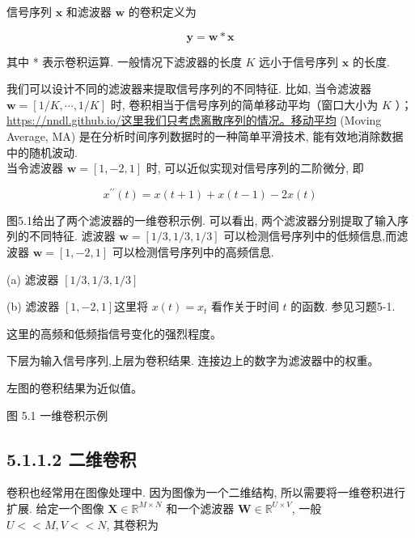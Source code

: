 \documentclass[10pt]{article}
\begin{document}
信号序列 $\boldsymbol{x}$ 和滤波器 $\boldsymbol{w}$ 的卷积定义为


\begin{equation*}
\boldsymbol{y}=\boldsymbol{w} * \boldsymbol{x} \tag{5.5}
\end{equation*}


其中 * 表示卷积运算. 一般情况下滤波器的长度 $K$ 远小于信号序列 $\boldsymbol{x}$ 的长度.

我们可以设计不同的滤波器来提取信号序列的不同特征. 比如, 当令滤波器 $\boldsymbol{w}=[1 / K, \cdots, 1 / K]$ 时, 卷积相当于信号序列的简单移动平均（窗口大小为 $K$ ）； \href{https://nndl.github.io/%E8%BF%99%E9%87%8C%E6%88%91%E4%BB%AC%E5%8F%AA%E8%80%83%E8%99%91%E7%A6%BB%E6%95%A3%E5%BA%8F%E5%88%97%E7%9A%84%E6%83%85%E5%86%B5%E3%80%82%E7%A7%BB%E5%8A%A8%E5%B9%B3%E5%9D%87}{https://nndl.github.io/这里我们只考虑离散序列的情况。移动平均} (Moving Average, MA) 是在分析时间序列数据时的一种简单平滑技术, 能有效地消除数据中的随机波动.\\
当令滤波器 $\boldsymbol{w}=[1,-2,1]$ 时, 可以近似实现对信号序列的二阶微分, 即


\begin{equation*}
x^{\prime \prime}(t)=x(t+1)+x(t-1)-2 x(t) \tag{5.6}
\end{equation*}


图5.1给出了两个滤波器的一维卷积示例. 可以看出, 两个滤波器分别提取了输入序列的不同特征. 滤波器 $\boldsymbol{w}=[1 / 3,1 / 3,1 / 3]$ 可以检测信号序列中的低频信息,而滤波器 $\boldsymbol{w}=[1,-2,1]$ 可以检测信号序列中的高频信息.



(a) 滤波器 $[1 / 3,1 / 3,1 / 3]$



(b) 滤波器 $[1,-2,1]$这里将 $x(t)=x_{t}$ 看作关于时间 $t$ 的函数. 参见习题5-1.

这里的高频和低频指信号变化的强烈程度。

下层为输入信号序列,上层为卷积结果. 连接边上的数字为滤波器中的权重。

左图的卷积结果为近似值。

图 5.1 一维卷积示例

\subsection*{5.1.1.2 二维卷积}
卷积也经常用在图像处理中. 因为图像为一个二维结构, 所以需要将一维卷积进行扩展. 给定一个图像 $\boldsymbol{X} \in \mathbb{R}^{M \times N}$ 和一个滤波器 $\boldsymbol{W} \in \mathbb{R}^{U \times V}$, 一般 $U<<M, V<<N$, 其卷积为
\end{document}
